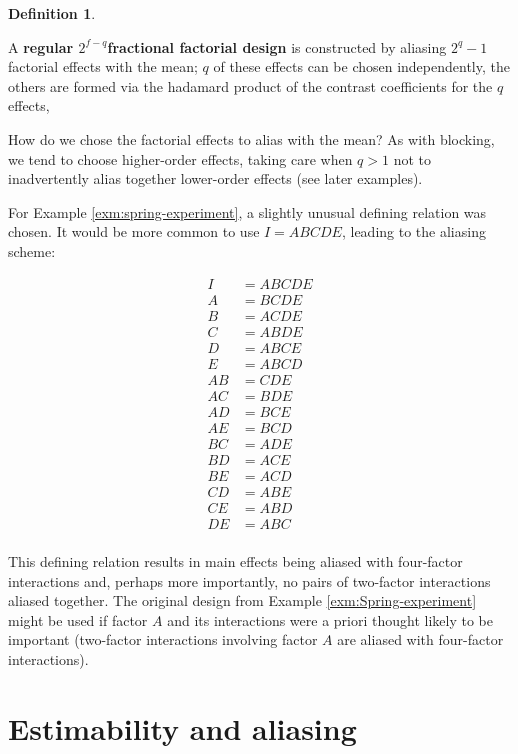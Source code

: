 \documentclass[
]{book}
\theoremstyle{definition}
\newtheorem{definition}{Definition}[chapter]
\theoremstyle{definition}
\theoremstyle{definition}
\theoremstyle{definition}
\theoremstyle{remark}
\begin{document}
\begin{definition}
\protect\hypertarget{def:regular-fraction}{}\label{def:regular-fraction}

A \textbf{regular \(2^{f-q}\)fractional factorial design} is constructed by aliasing \(2^q-1\) factorial effects with the mean; \(q\) of these effects can be chosen independently, the others are formed via the hadamard product of the contrast coefficients for the \(q\) effects,

\end{definition}

How do we chose the factorial effects to alias with the mean? As with blocking, we tend to choose higher-order effects, taking care when \(q>1\) not to inadvertently alias together lower-order effects (see later examples).

For Example \ref{exm:spring-experiment}, a slightly unusual defining relation was chosen. It would be more common to use \(I = ABCDE\), leading to the aliasing scheme:

\begin{align}
I & = ABCDE \\
A & = BCDE \\
B & = ACDE \\
C & = ABDE \\
D & = ABCE \\
E & = ABCD \\
AB & = CDE \\
AC & = BDE \\
AD & = BCE \\
AE & = BCD \\
BC & = ADE \\
BD & = ACE \\
BE & = ACD \\
CD & = ABE \\
CE & = ABD \\
DE & = ABC \\
\end{align}

This defining relation results in main effects being aliased with four-factor interactions and, perhaps more importantly, no pairs of two-factor interactions aliased together. The original design from Example \ref{exm:Spring-experiment} might be used if factor \(A\) and its interactions were a priori thought likely to be important (two-factor interactions involving factor \(A\) are aliased with four-factor interactions).

\hypertarget{est-alias}{%
\section{Estimability and aliasing}\label{est-alias}}
\end{document}
